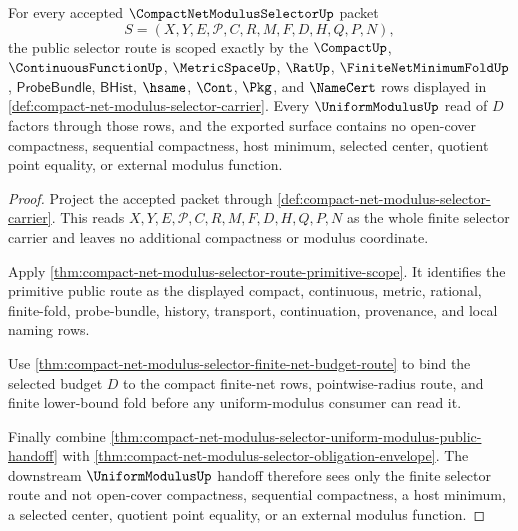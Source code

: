 \begin{theorem}
\label{thm:compact-net-modulus-selector-primitive-scope-closure}
For every accepted $\CompactNetModulusSelectorUp$ packet
$$
S=(X,Y,E,\mathcal{P},C,R,M,F,D,H,Q,P,N),
$$
the public selector route is scoped exactly by the $\CompactUp$, $\ContinuousFunctionUp$, $\MetricSpaceUp$, $\RatUp$, $\FiniteNetMinimumFoldUp$, $\mathsf{ProbeBundle}$, $\mathsf{BHist}$, $\hsame$, $\Cont$, $\Pkg$, and $\NameCert$ rows displayed in \autoref{def:compact-net-modulus-selector-carrier}. Every $\UniformModulusUp$ read of $D$ factors through those rows, and the exported surface contains no open-cover compactness, sequential compactness, host minimum, selected center, quotient point equality, or external modulus function.
\end{theorem}
\begin{proof}
Project the accepted packet through \autoref{def:compact-net-modulus-selector-carrier}. This reads $X,Y,E,\mathcal{P},C,R,M,F,D,H,Q,P,N$ as the whole finite selector carrier and leaves no additional compactness or modulus coordinate.

Apply \autoref{thm:compact-net-modulus-selector-route-primitive-scope}. It identifies the primitive public route as the displayed compact, continuous, metric, rational, finite-fold, probe-bundle, history, transport, continuation, provenance, and local naming rows.

Use \autoref{thm:compact-net-modulus-selector-finite-net-budget-route} to bind the selected budget $D$ to the compact finite-net rows, pointwise-radius route, and finite lower-bound fold before any uniform-modulus consumer can read it.

Finally combine \autoref{thm:compact-net-modulus-selector-uniform-modulus-public-handoff} with \autoref{thm:compact-net-modulus-selector-obligation-envelope}. The downstream $\UniformModulusUp$ handoff therefore sees only the finite selector route and not open-cover compactness, sequential compactness, a host minimum, a selected center, quotient point equality, or an external modulus function.
\end{proof}

